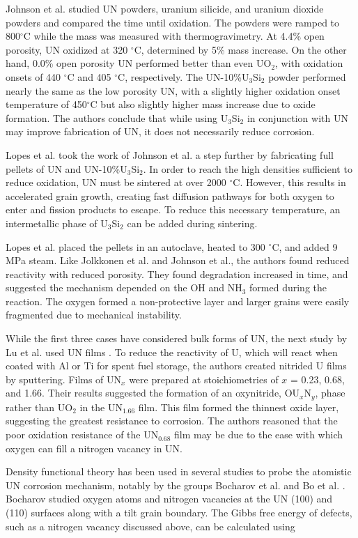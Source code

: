 \documentclass[11pt]{article}
\begin{document}
Johnson et al. \cite{Johnson2016} studied UN powders, uranium silicide, and uranium dioxide powders and compared the time until oxidation. The powders were ramped to 800$^{\circ}$C while the mass was measured with thermogravimetry. At 4.4\% open porosity, UN oxidized at 320 $^{\circ}$C, determined by 5\% mass increase. On the other hand, 0.0\% open porosity UN performed better than even UO$_{2}$, with oxidation onsets of 440 $^{\circ}$C and 405 $^{\circ}$C, respectively. The UN-10\%U$_{3}$Si$_{2}$ powder performed nearly the same as the low porosity UN, with a slightly higher oxidation onset temperature of 450$^{\circ}$C but also slightly higher mass increase due to oxide formation. The authors conclude that while using U$_{3}$Si$_{2}$ in conjunction with UN may improve fabrication of UN, it does not necessarily reduce corrosion.
\par 
Lopes et al. \cite{Lopes2017} took the work of Johnson et al. a step further by fabricating full pellets of UN and UN-10\%U$_{3}$Si$_{2}$. In order to reach the high densities sufficient to reduce oxidation, UN must be sintered at over 2000 $^{\circ}$C. However, this results in accelerated grain growth, creating fast diffusion pathways for both oxygen to enter and fission products to escape. To reduce this necessary temperature, an intermetallic phase of U$_{3}$Si$_{2}$ can be added during sintering.
\par 
Lopes et al. placed the pellets in an autoclave, heated to 300 $^{\circ}$C, and added 9 MPa steam. Like Jolkkonen et al. and Johnson et al., the authors found reduced reactivity with reduced porosity. They found degradation increased in time, and suggested the mechanism depended on the OH and NH$_{3}$ formed during the reaction. The oxygen formed a non-protective layer and larger grains were easily fragmented due to mechanical instability.

While the first three cases have considered bulk forms of UN, the next study by Lu et al. used UN films \cite{Lu2016}. To reduce the reactivity of U, which will react when coated with Al or Ti for spent fuel storage, the authors created nitrided U films by sputtering. Films of UN$_{x}$ were prepared at stoichiometries of $x$ = 0.23, 0.68, and 1.66. Their results suggested the formation of an oxynitride, OU$_{x}$N$_{y}$, phase rather than UO$_{2}$ in the UN$_{1.66}$ film. This film formed the thinnest oxide layer, suggesting the greatest resistance to corrosion. The authors reasoned that the poor oxidation resistance of the UN$_{0.68}$ film may be due to the ease with which oxygen can fill a nitrogen vacancy in UN.
\par 
Density functional theory has been used in several studies to probe the atomistic UN corrosion mechanism, notably by the groups Bocharov et al. \cite{Bocharov2013} and Bo et al. \cite{Bo2016}. Bocharov studied oxygen atoms and nitrogen vacancies at the UN (100) and (110) surfaces along with a tilt grain boundary. The Gibbs free energy of defects, such as a nitrogen vacancy discussed above, can be calculated using
\end{document}
